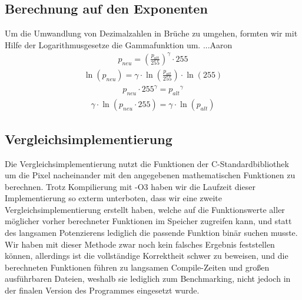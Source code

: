 \documentclass[course=erap]{aspdoc}
\begin{document}
	\subsection{Berechnung auf den Exponenten}
	Um die Umwandlung von Dezimalzahlen in Brüche zu umgehen, formten wir mit Hilfe der Logarithmusgesetze die Gammafunktion um. ...Aaron
	\begin{align}	
	p_{neu} = \left(\frac{p_{alt}}{255}\right)^{\gamma} \cdot 255
	\end{align}
	\begin{align}	
	\ln (p_{neu}) = \gamma \cdot \ln\left(\frac{p_{alt}}{255}\right) \cdot \ln(255)
	\end{align}
	\begin{align}
	p_{neu} \cdot 255^\gamma = {p_{alt}}^{\gamma}
	\end{align}
	\begin{align}
	\gamma \cdot \ln ( p_{neu} \cdot 255) = \gamma \cdot \ln({p_{alt}})
	\end{align}
	
	\subsection{Vergleichsimplementierung}
	Die Vergleichsimplementierung nutzt die Funktionen der C-Standardbibliothek um die Pixel nacheinander mit den angegebenen mathematischen Funktionen zu berechnen. Trotz Kompilierung mit -O3 haben wir die Laufzeit dieser Implementierung so exterm unterboten, dass wir eine zweite Vergleichsimplementierung erstellt haben, welche auf die Funktionswerte aller möglicher vorher berechneter Funktionen im Speicher zugreifen kann, und statt des langsamen Potenzierens lediglich die passende Funktion binär suchen musste. Wir haben mit dieser Methode zwar noch kein falsches Ergebnis feststellen können, allerdings ist die vollständige Korrektheit schwer zu beweisen, und die berechneten Funktionen führen zu langsamen Compile-Zeiten und großen ausführbaren Dateien, weshalb sie lediglich zum Benchmarking, nicht jedoch in der finalen Version des Programmes eingesetzt wurde.
\end{document}
